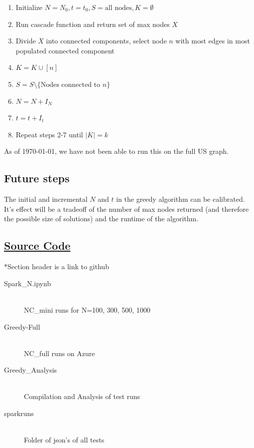 \documentclass{article}
\begin{document}
\begin{description}
			\begin{enumerate}
			  \item Initialize $N=N_0,t=t_0,S=\text{all nodes},K=\emptyset$
			  \item Run cascade function and return set of max nodes $X$
			  \item Divide $X$ into connected components, select node $n$ with most edges in most populated connected component
			  \item $K = K \cup [n]$
			  \item $S = S \setminus \{\text{Nodes connected to }n\}$
			  \item $N = N + I_N$
			  \item $t = t + I_t$
			  \item Repeat steps 2-7 until $|K|=k$
			\end{enumerate}

			As of \today, we have not been able to run this on the full US graph.
			
	\end{description}

	\subsection{Future steps}

		The initial and incremental $N$ and $t$ in the greedy algorithm can be calibrated. It's effect will be a tradeoff of the number of max nodes returned (and therefore the possible size of solutions) and the runtime of the algorithm.

	\subsection{\href{https://github.com/chuckyouliu/Influence-Maximization}{Source Code}}

	*Section header is a link to github

	\begin{description}
		\item[Spark\_N.ipynb] \hfill \\
			NC\_mini runs for N=100, 300, 500, 1000
		\item[Greedy-Full] \hfill \\
			NC\_full runs on Azure
		\item[Greedy\_Analysis] \hfill \\
			Compilation and Analysis of test runs
		\item[sparkruns] \hfill \\
			Folder of json's of all tests
	\end{description}
\end{document}
